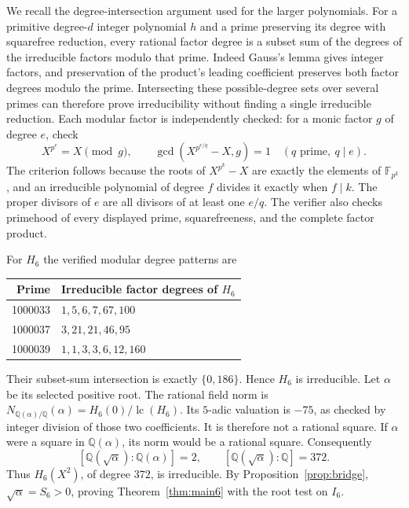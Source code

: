\documentclass[11pt]{article}
\newcommand{\Q}{\mathbb Q}
\begin{document}
We recall the degree-intersection argument used for the larger polynomials.
For a primitive degree-$d$ integer polynomial $h$ and a prime preserving
its degree with squarefree reduction, every rational factor degree is
a subset sum of the degrees of the irreducible factors modulo that prime.
Indeed Gauss's lemma gives integer factors, and preservation of the
product's leading coefficient preserves both factor degrees modulo the
prime. Intersecting these possible-degree sets over several primes can
therefore prove irreducibility without finding a single irreducible
reduction. Each modular factor is independently checked: for a monic
factor $g$ of degree $e$, check
\begin{equation}\label{eq:Rabin}
 X^{p^e}=X\pmod g,\qquad
 \gcd(X^{p^{e/q}}-X,g)=1\quad(q\text{ prime},\ q\mid e).
\end{equation}
The criterion follows because the roots of $X^{p^k}-X$ are exactly the
elements of $\mathbb F_{p^k}$, and an irreducible polynomial of degree
$f$ divides it exactly when $f\mid k$. The proper divisors of $e$ are
all divisors of at least one $e/q$. The verifier also checks primehood
of every displayed prime, squarefreeness, and the complete factor product.

For $H_6$ the verified modular degree patterns are
\begin{center}\small
\begin{tabular}{rl}
\toprule Prime&Irreducible factor degrees of $H_6$\\\midrule
1000033&$1,5,6,7,67,100$\\
1000037&$3,21,21,46,95$\\
1000039&$1,1,3,3,6,12,160$\\\bottomrule
\end{tabular}
\end{center}
Their subset-sum intersection is exactly $\{0,186\}$. Hence $H_6$ is
irreducible. Let $\alpha$ be its selected positive root. The rational
field norm is $N_{\Q(\alpha)/\Q}(\alpha)=H_6(0)/\operatorname{lc}(H_6)$.
Its $5$-adic valuation is $-75$, as checked by integer division of those
two coefficients. It is therefore not a rational square. If $\alpha$
were a square in $\Q(\alpha)$, its norm would be a rational square.
Consequently
\[
 [\Q(\sqrt\alpha):\Q(\alpha)]=2,
 \qquad[\Q(\sqrt\alpha):\Q]=372.
\]
Thus $H_6(X^2)$, of degree $372$, is irreducible. By
Proposition~\ref{prop:bridge}, $\sqrt\alpha=S_6>0$, proving
Theorem~\ref{thm:main6} with the root test on $I_6$.
\end{document}
